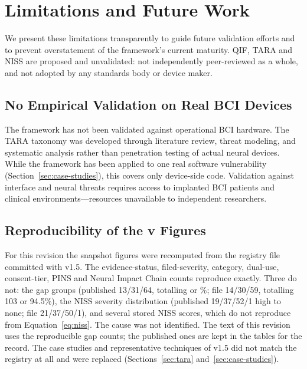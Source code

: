 
\section{Limitations and Future Work}
\label{sec:limitations}

We present these limitations transparently to guide future validation efforts and
to prevent overstatement of the framework's current maturity. QIF, TARA and NISS are
proposed and unvalidated: not independently peer-reviewed as a whole, and not adopted by
any standards body or device maker.

\subsection{No Empirical Validation on Real BCI Devices}

The \qif framework has not been validated against operational BCI hardware.
The TARA taxonomy was developed through literature review, threat modeling, and
systematic analysis rather than penetration testing of actual neural devices.
While the framework has been applied to one real software vulnerability
(Section~\ref{sec:case-studies}), this covers only device-side code. Validation
against interface and neural threats requires access to implanted BCI
patients and clinical environments---resources unavailable to independent
researchers.

\subsection{Reproducibility of the v\SnapshotRegistryVersion{} Figures}

For this revision the snapshot figures were recomputed from the registry file committed
with v1.5. The evidence-status, filed-severity, category, dual-use, consent-tier, PINS and
Neural Impact Chain counts reproduce exactly. Three do not: the gap groups (published
13/31/64, totalling \SnapshotGapTechniques{} or \SnapshotGapPercent\%; file 14/30/59,
totalling 103 or 94.5\%), the NISS severity distribution (published 19/37/52/1 high to none;
file 21/37/50/1), and several stored NISS scores, which do not reproduce from
Equation~\ref{eq:niss}. The cause was not identified. The text of this revision uses the
reproducible gap counts; the published ones are kept in the tables for the record. The case
studies and representative techniques of v1.5 did not match the registry at all and were
replaced (Sections~\ref{sec:tara} and~\ref{sec:case-studies}).


